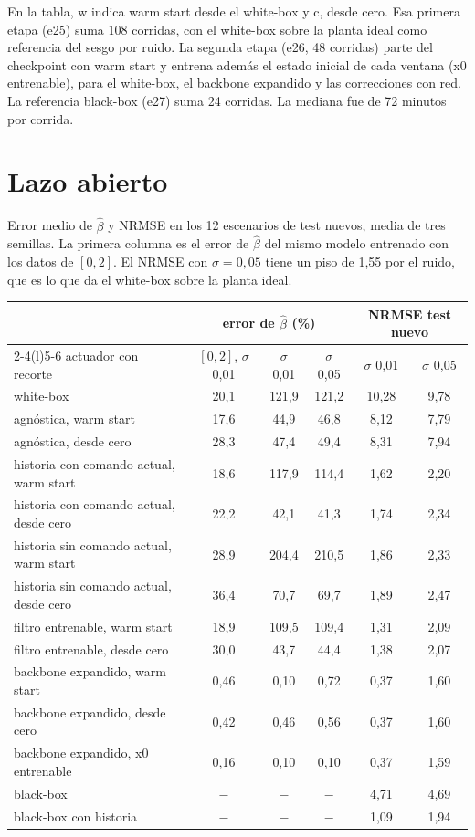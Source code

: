 \documentclass[10pt,a4paper]{article}
\newcommand{\bh}{\hat\beta}
\begin{document}
En la tabla, w indica warm start desde el white-box y c, desde cero. Esa primera etapa (e25) suma 108 corridas, con el white-box sobre la planta ideal como referencia del sesgo por ruido. La segunda etapa (e26, 48 corridas) parte del checkpoint con warm start y entrena además el estado inicial de cada ventana (x0 entrenable), para el white-box, el backbone expandido y las correcciones con red. La referencia black-box (e27) suma 24 corridas. La mediana fue de 72 minutos por corrida.

\section{Lazo abierto}

Error medio de $\bh$ y NRMSE en los 12 escenarios de test nuevos, media de tres semillas. La primera columna es el error de $\bh$ del mismo modelo entrenado con los datos de $[0, 2]$. El NRMSE con $\sigma = 0{,}05$ tiene un piso de 1,55 por el ruido, que es lo que da el white-box sobre la planta ideal.

\begin{center}
\small
\begin{tabular}{@{}lccccc@{}}
\toprule
& \multicolumn{3}{c}{error de $\bh$ (\%)} & \multicolumn{2}{c}{NRMSE test nuevo} \\
\cmidrule(lr){2-4}\cmidrule(l){5-6}
actuador con recorte & $[0, 2]$, $\sigma$ 0,01 & $\sigma$ 0,01 & $\sigma$ 0,05 & $\sigma$ 0,01 & $\sigma$ 0,05 \\
\midrule
white-box & 20,1 & 121,9 & 121,2 & 10,28 & 9,78 \\
agnóstica, warm start & 17,6 & 44,9 & 46,8 & 8,12 & 7,79 \\
agnóstica, desde cero & 28,3 & 47,4 & 49,4 & 8,31 & 7,94 \\
historia con comando actual, warm start & 18,6 & 117,9 & 114,4 & 1,62 & 2,20 \\
historia con comando actual, desde cero & 22,2 & 42,1 & 41,3 & 1,74 & 2,34 \\
historia sin comando actual, warm start & 28,9 & 204,4 & 210,5 & 1,86 & 2,33 \\
historia sin comando actual, desde cero & 36,4 & 70,7 & 69,7 & 1,89 & 2,47 \\
filtro entrenable, warm start & 18,9 & 109,5 & 109,4 & 1,31 & 2,09 \\
filtro entrenable, desde cero & 30,0 & 43,7 & 44,4 & 1,38 & 2,07 \\
backbone expandido, warm start & 0,46 & 0,10 & 0,72 & 0,37 & 1,60 \\
backbone expandido, desde cero & 0,42 & 0,46 & 0,56 & 0,37 & 1,60 \\
backbone expandido, x0 entrenable & 0,16 & 0,10 & 0,10 & 0,37 & 1,59 \\
black-box & $-$ & $-$ & $-$ & 4,71 & 4,69 \\
black-box con historia & $-$ & $-$ & $-$ & 1,09 & 1,94 \\
\bottomrule
\end{tabular}
\end{center}
\end{document}
